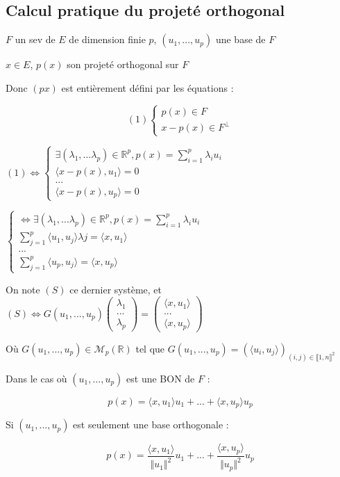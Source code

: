 \documentclass[a4paper,12pt]{book}
\newcommand{\Prop}[2]{\begin{tcolorbox}[sharp corners, colback=white,colframe=red!90!black!75, title=Proposition : #1]#2\end{tcolorbox}}
\newcommand{\Pre}[1]{\begin{tcolorbox}[sharp corners, colback=white,colframe=green!60!green!30!black!75, title=Preuve]#1\end{tcolorbox}}
\def\R{\mathbb{R}}
\begin{document}
\subsection{Calcul pratique du projeté orthogonal}
\Prop{}{$F$ un sev de $E$ de dimension finie $p$, $(u_1, ..., u_p)$ une base de $F$
\par $x\in E$, $p(x)$ son projeté orthogonal sur $F$
\par Donc $(px)$ est entièrement défini par les équations :
\par $$(1)\left\{\begin{array}{l} p(x)\in F \\ x-p(x)\in F^\perp\end{array}\right.$$}
\Pre{$(1)\Leftrightarrow \left\{\begin{array}{l}\exists (\lambda_1, ...\lambda_p)\in\R^p, p(x) = \sum\limits_{i=1}^p\lambda_iu_i \\ \langle x - p(x), u_1\rangle = 0 \\ ... \\ \langle x - p(x), u_p\rangle = 0\end{array}\right.$
\par $\left\{\begin{array}{l}\Leftrightarrow \exists (\lambda_1, ...\lambda_p)\in\R^p, p(x) = \sum\limits_{i=1}^p\lambda_iu_i \\ \sum\limits_{j=1}^p\langle u_1, u_j\rangle \lambda j = \langle x, u_1\rangle \\ ... \\ \sum\limits_{j=1}^p\langle u_p, u_j\rangle = \langle x, u_p\rangle\end{array}\right.$
}
On note $(S)$ ce dernier système, et $(S)\Leftrightarrow G(u_1,..., u_p)\begin{pmatrix} \lambda_1 \\ ...\\ \lambda_p\end{pmatrix} = \begin{pmatrix} \langle x,u_1\rangle\\ ... \\ \langle x, u_p\rangle\end{pmatrix}$ 
\par Où $G(u_1, ..., u_p)\in \mathcal{M}_p(\R)$ tel que $G(u_1,..., u_p) = (\langle u_i, u_j\rangle)_{(i,j)\in\llbracket 1,n\rrbracket^2}$
\par Dans le cas où $(u_1,..., u_p)$ est une BON de $F$ :
\par $$ p(x) = \langle x, u_1\rangle u_1 + ... + \langle x, u_p\rangle u_p$$
\par Si $(u_1, ..., u_p)$ est seulement une base orthogonale :
\par $$p(x) = \frac{\langle x, u_1\rangle}{\Vert u_1\Vert^2}u_1+...+\frac{\langle x, u_p\rangle}{\Vert u_p\Vert^2}u_p$$
\end{document}

